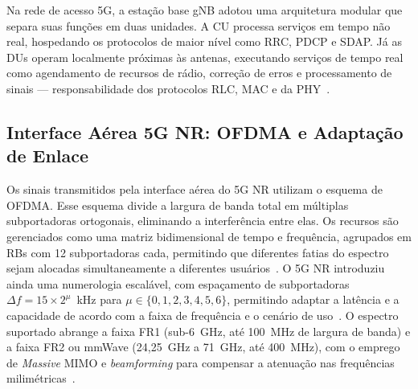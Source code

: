 \begin{figure}[ht!]
\end{figure}

Na rede de acesso \gls{5G}, a estação base \gls{gNB} adotou uma arquitetura modular que separa suas funções em duas unidades. A \gls{CU} processa serviços em tempo não real, hospedando os protocolos de maior nível como \gls{RRC}, \gls{PDCP} e \gls{SDAP}. Já as \glspl{DU} operam localmente próximas às antenas, executando serviços de tempo real como agendamento de recursos de rádio, correção de erros e processamento de sinais --- responsabilidade dos protocolos \gls{RLC}, \gls{MAC} e da \gls{PHY}~\cite{fowdur2025, cox2025}.

\subsection{Interface Aérea \texorpdfstring{\gls{5G}}{5G} \texorpdfstring{\gls{NR}}{\gls{NR}}: \texorpdfstring{\gls{OFDMA}}{OFDMA} e Adaptação de Enlace}
\label{subsec:interface-aerea-5g}

Os sinais transmitidos pela interface aérea do \gls{5G} \gls{NR} utilizam o esquema de \gls{OFDMA}. Esse esquema divide a largura de banda total em múltiplas subportadoras ortogonais, eliminando a interferência entre elas. Os recursos são gerenciados como uma matriz bidimensional de tempo e frequência, agrupados em \glspl{RB} com 12 subportadoras cada, permitindo que diferentes fatias do espectro sejam alocadas simultaneamente a diferentes usuários~\cite{stallings2021, asplund2025}. O \gls{5G} \gls{NR} introduziu ainda uma numerologia escalável, com espaçamento de subportadoras $\Delta f = 15 \times 2^{\mu}$~kHz para $\mu \in \{0, 1, 2, 3, 4, 5, 6\}$, permitindo adaptar a latência e a capacidade de acordo com a faixa de frequência e o cenário de uso~\cite{cox2025}. O espectro suportado abrange a faixa \gls{FR1} (sub-6~GHz, até 100~MHz de largura de banda) e a faixa \gls{FR2} ou \gls{mmWave} (24,25~GHz a 71~GHz, até 400~MHz), com o emprego de \textit{Massive} \gls{MIMO} e \textit{beamforming} para compensar a atenuação nas frequências milimétricas~\cite{stallings2021, asplund2025}.

